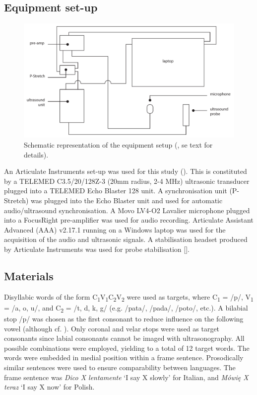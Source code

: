 \documentclass[authoryear]{elsarticle}
\begin{document}
\subsection{Equipment set-up}\label{equipment-set-up}

\begin{figure}[htbp]
\centering
\includegraphics[width=1.00000\textwidth]{../../graphics/uti-setup.pdf}
\caption{Schematic representation of the equipment setup
(\citealt{articulate2011}, se text for details).\label{f:uti-setup}}
\end{figure}

An Articulate Instruments set-up was used for this study
(). This is constituted by a TELEMED C3.5/20/128Z-3
(20mm radius, 2-4 MHz) ultrasonic transducer plugged into a TELEMED Echo
Blaster 128 unit. A synchronisation unit (P-Stretch) was plugged into
the Echo Blaster unit and used for automatic audio/ultrasound
synchronisation. A Movo LV4-O2 Lavalier microphone plugged into a
FocusRight pre-amplifier was used for audio recording. Articulate
Assistant Advanced (AAA) v2.17.1 running on a Windows laptop was used
for the acquisition of the audio and ultrasonic signals. A stabilisation
headset produced by Articulate Instruments was used for probe
stabilisation {[}{]}.

\subsection{Materials}\label{materials}

Disyllabic words of the form
C\textsubscript{1}V\textsubscript{1}C\textsubscript{2}V\textsubscript{2}
were used as targets, where C\textsubscript{1} = /p/, V\textsubscript{1}
= /a, o, u/, and C\textsubscript{2} = /t, d, k, g/ (e.g. /pata/, /pada/,
/poto/, etc.). A bilabial stop /p/ was chosen as the first consonant to
reduce influence on the following vowel (although cf.
\citet{vazquez-alvarez2007}). Only coronal and velar stops were used as
target consonants since labial consonants cannot be imaged with
ultrasonography. All possible combinations were employed, yielding to a
total of 12 target words. The words were embedded in medial position
within a frame sentence. Prosodically similar sentences were used to
ensure comparability between languages. The frame sentence was
\emph{Dico X lentamente} `I say X slowly' for Italian, and \emph{Mówię X
teraz} `I say X now' for Polish.
\end{document}

